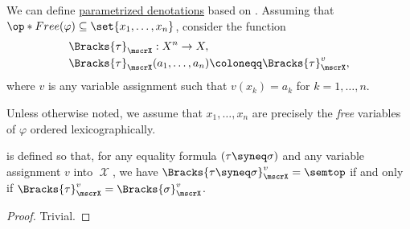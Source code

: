 \begin{definition}\label{def:fol_parameterized_formula_denotation}
  We can define \hyperref[con:parametrized_denotation]{parametrized denotations} based on . Assuming that \( \op*{Free}(\varphi) \subseteq \set{ x_1, \ldots, x_n } \), consider the function
  \begin{equation*}
    \begin{aligned}
      &\Bracks{\tau}_\mscrX: X^n \to X, \\
      &\Bracks{\tau}_\mscrX(a_1, \ldots, a_n) \coloneqq \Bracks{\tau}_\mscrX^v,
    \end{aligned}
  \end{equation*}
  where \( v \) is any variable assignment such that \( v(x_k) = a_k \) for \( k = 1, \ldots, n \).

  Unless otherwise noted, we assume that \( x_1, \ldots, x_n \) are precisely the \emph{free} variables of \( \varphi \) ordered lexicographically.
\end{definition}

\begin{proposition}\label{thm:fol_equality_characterization}
   is defined so that, for any equality formula \( (\tau \syneq \sigma) \) and any variable assignment \( v \) into \( \mscrX \), we have \( \Bracks{\tau \syneq \sigma}_\mscrX^v = \semtop \) if and only if \( \Bracks{\tau}_\mscrX^v = \Bracks{\sigma}_\mscrX^v \).
\end{proposition}
\begin{proof}
  Trivial.
\end{proof}


